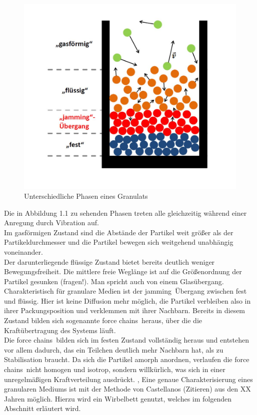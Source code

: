 \begin{center}
\begin{figure}[h]
	\includegraphics[scale=0.45]{Einleitung_1.jpg}
	\caption{Unterschiedliche Phasen eines Granulats  \cite{Darmstadt2015}}
\end{figure}	
\end{center}

Die in Abbildung 1.1 zu sehenden Phasen treten alle gleichzeitig während einer Anregung durch Vibration auf. \\
Im gasförmigen Zustand sind die Abstände der Partikel weit größer als der Partikeldurchmesser und die Partikel bewegen sich weitgehend unabhängig voneinander. \\
Der darunterliegende flüssige Zustand bietet bereits deutlich weniger Bewegungsfreiheit. Die mittlere freie Weglänge ist auf die Größenordnung der Partikel gesunken (fragen!). Man spricht auch von einem Glasübergang. \\
Charakteristisch für granulare Medien ist der \glqq jamming\grqq \ Übergang zwischen fest und flüssig. Hier ist keine Diffusion mehr möglich, die Partikel verbleiben also in ihrer Packungsposition und verklemmen mit ihrer Nachbarn. Bereits in diesem Zustand bilden sich sogenannte \glqq force chains\grqq \ heraus, über die die Kraftübertragung des Systems läuft. \\
Die \glqq force chains\grqq \ bilden sich im festen Zustand vollständig heraus und entstehen vor allem dadurch, das ein Teilchen deutlich mehr Nachbarn hat, als zu Stabilisation braucht. Da sich die Partikel amorph anordnen, verlaufen die \glqq force chains\grqq \ nicht homogen und isotrop, sondern willkürlich, was sich in einer unregelmäßigen Kraftverteilung ausdrückt. \cite{Darmstadt2015}, \cite{Fallturmexperiment}
Eine genaue Charakterisierung eines granularen Mediums ist mit der Methode von Castellanos (Zitieren) aus den XX Jahren möglich. Hierzu wird ein Wirbelbett genutzt, welches im folgenden Abschnitt erläutert wird.


